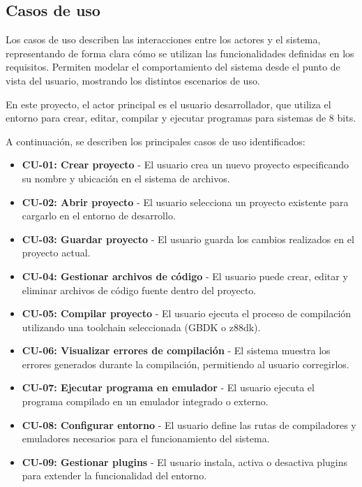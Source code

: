 \documentclass[../../main.tex]{subfiles}
\begin{document}
\subsection{Casos de uso}

Los casos de uso describen las interacciones entre los actores y el sistema, representando de forma clara cómo se utilizan las funcionalidades definidas en los requisitos. Permiten modelar el comportamiento del sistema desde el punto de vista del usuario, mostrando los distintos escenarios de uso.

En este proyecto, el actor principal es el usuario desarrollador, que utiliza el entorno para crear, editar, compilar y ejecutar programas para sistemas de 8 bits.

A continuación, se describen los principales casos de uso identificados:

\begin{itemize}
    \item \textbf{CU-01: Crear proyecto} - El usuario crea un nuevo proyecto especificando su nombre y ubicación en el sistema de archivos.
    
    \item \textbf{CU-02: Abrir proyecto} - El usuario selecciona un proyecto existente para cargarlo en el entorno de desarrollo.
        
    \item \textbf{CU-03: Guardar proyecto} - El usuario guarda los cambios realizados en el proyecto actual.
    
    \item \textbf{CU-04: Gestionar archivos de código} - El usuario puede crear, editar y eliminar archivos de código fuente dentro del proyecto.

    \item \textbf{CU-05: Compilar proyecto} - El usuario ejecuta el proceso de compilación utilizando una toolchain seleccionada (GBDK o z88dk).
    
    \item \textbf{CU-06: Visualizar errores de compilación} - El sistema muestra los errores generados durante la compilación, permitiendo al usuario corregirlos.
    
    \item \textbf{CU-07: Ejecutar programa en emulador} - El usuario ejecuta el programa compilado en un emulador integrado o externo.
    
    \item \textbf{CU-08: Configurar entorno} - El usuario define las rutas de compiladores y emuladores necesarios para el funcionamiento del sistema.
    
    \item \textbf{CU-09: Gestionar plugins} - El usuario instala, activa o desactiva plugins para extender la funcionalidad del entorno.
\end{itemize}
\end{document}
